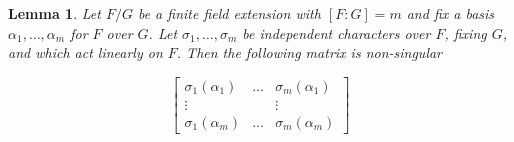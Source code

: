 \documentclass[sigconf]{acmart}
\newtheorem{lemma}{Lemma}
\begin{document}
\begin{lemma}\label{charindlem}
Let $F/G$ be a finite field extension with $[F:G] = m$ and fix a basis $\alpha_1, \ldots, \alpha_m$ for $F$ over $G$. Let $\sigma_1, \ldots, \sigma_m$ be independent characters over $F$, fixing $G$, and which act linearly on $F$. Then the following matrix is non-singular

\begin{equation*}
 \begin{bmatrix}
\sigma_1(\alpha_1) & \ldots & \sigma_m(\alpha_1) \\ \vdots & & \vdots \\ \sigma_1(\alpha_m) & \ldots & \sigma_m(\alpha_m) 
\end{bmatrix}   
\end{equation*}


\end{lemma}
\end{document}
